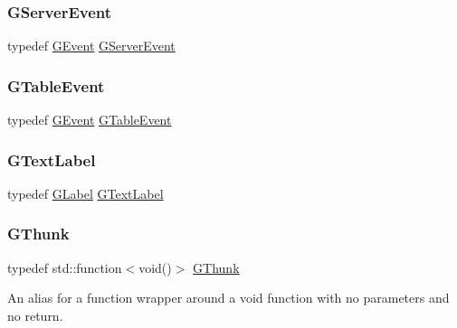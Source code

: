 \subsubsection{\texorpdfstring{G\+Server\+Event}{GServerEvent}}
{\footnotesize\ttfamily typedef \mbox{\hyperlink{classsgl_1_1GEvent}{G\+Event}} \mbox{\hyperlink{namespacesgl_aa79f98272dc4f07892e41470d23293b2}{G\+Server\+Event}}}

\mbox{\label{namespacesgl_a515146871770e915a5b3857de61e84b7}} 
\subsubsection{\texorpdfstring{G\+Table\+Event}{GTableEvent}}
{\footnotesize\ttfamily typedef \mbox{\hyperlink{classsgl_1_1GEvent}{G\+Event}} \mbox{\hyperlink{namespacesgl_a515146871770e915a5b3857de61e84b7}{G\+Table\+Event}}}

\mbox{\label{namespacesgl_a7240b4dda0f3120513f729a11318a45c}} 
\subsubsection{\texorpdfstring{G\+Text\+Label}{GTextLabel}}
{\footnotesize\ttfamily typedef \mbox{\hyperlink{classsgl_1_1GLabel}{G\+Label}} \mbox{\hyperlink{namespacesgl_a7240b4dda0f3120513f729a11318a45c}{G\+Text\+Label}}}

\mbox{\label{namespacesgl_aa508400d1219d217e0e9509ff59a58f4}} 
\subsubsection{\texorpdfstring{G\+Thunk}{GThunk}}
{\footnotesize\ttfamily typedef std\+::function$<$void()$>$ \mbox{\hyperlink{namespacesgl_aa508400d1219d217e0e9509ff59a58f4}{G\+Thunk}}}



An alias for a function wrapper around a void function with no parameters and no return. 

\mbox{\label{namespacesgl_a2c46348e6e6dbf761bcceddb93945ac3}} 
